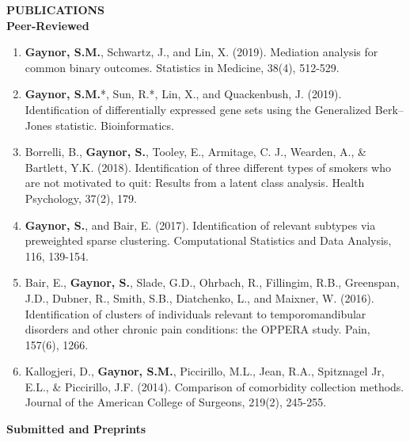 \documentclass[10pt]{article}
\begin{document}

{ \bf PUBLICATIONS} \hrulefill \\

\indent \textbf{Peer-Reviewed} \\
\begin{enumerate}
\item \textbf{Gaynor, S.M.}, Schwartz, J., and Lin, X. (2019). Mediation analysis for common binary outcomes. Statistics in Medicine, 38(4), 512-529.
\item \textbf{Gaynor, S.M.}*, Sun, R.*, Lin, X., and Quackenbush, J. (2019). Identification of differentially expressed gene sets using the Generalized Berk–Jones statistic. Bioinformatics.
\item Borrelli, B., \textbf{Gaynor, S.}, Tooley, E., Armitage, C. J., Wearden, A., \& Bartlett, Y.K. (2018). Identification of three different types of smokers who are not motivated to quit: Results from a latent class analysis. Health Psychology, 37(2), 179.
\item \textbf{Gaynor, S.}, and Bair, E. (2017). Identification of relevant subtypes via preweighted sparse clustering. Computational Statistics and Data Analysis, 116, 139-154.
\item Bair, E., \textbf{Gaynor, S.}, Slade, G.D., Ohrbach, R., Fillingim, R.B., Greenspan, J.D., Dubner, R., Smith, S.B., Diatchenko, L., and Maixner, W. (2016). Identification of clusters of individuals relevant to temporomandibular disorders and other chronic pain conditions: the OPPERA study. Pain, 157(6), 1266.
\item Kallogjeri, D., \textbf{Gaynor, S.M.}, Piccirillo, M.L., Jean, R.A., Spitznagel Jr, E.L., \& Piccirillo, J.F. (2014). Comparison of comorbidity collection methods. Journal of the American College of Surgeons, 219(2), 245-255.\\
\end{enumerate}

\vspace{0.2cm}

\indent \textbf{Submitted and Preprints} \\
\end{document}
